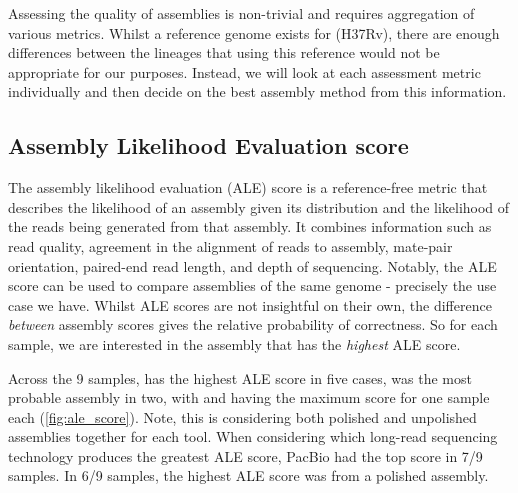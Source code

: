 Assessing the quality of \denovo{} assemblies is non-trivial and requires aggregation of various metrics. Whilst a reference genome exists for \mtb{} (H37Rv), there are enough differences between the \mtb{} lineages that using this reference would not be appropriate for our purposes. Instead, we will look at each assessment metric individually and then decide on the best assembly method from this information.

\subsection{Assembly Likelihood Evaluation score}

The assembly likelihood evaluation (ALE) score is a reference-free metric that describes the likelihood of an assembly given its \kmer{} distribution and the likelihood of the reads being generated from that assembly. It combines information such as read quality, agreement in the alignment of reads to assembly, mate-pair orientation, paired-end read length, and depth of sequencing. Notably, the ALE score can be used to compare assemblies of the same genome - precisely the use case we have. Whilst ALE scores are not insightful on their own, the difference \textit{between} assembly scores gives the relative probability of correctness. So for each sample, we are interested in the assembly that has the \textit{highest} ALE score.  

Across the 9 samples,  has the highest ALE score in five cases,  was the most probable assembly in two, with  and  having the maximum score for one sample each (\autoref{fig:ale_score}). Note, this is considering both polished and unpolished assemblies together for each tool. When considering which long-read sequencing technology produces the greatest ALE score, PacBio had the top score in 7/9 samples. In 6/9 samples, the highest ALE score was from a polished assembly.

